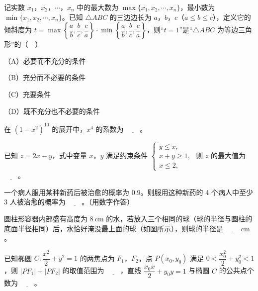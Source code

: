 \begin{question}
记实数 $x_1$，$x_2$，$\cdots$，$x_n$ 中的最大数为 $\max\{x_1,x_2,\cdots,x_n\}$，最小数为 $\min\{x_1,x_2,\cdots,x_n\}$。已知 $\triangle ABC$ 的三边边长为 $a$，$b$，$c$（$a\leqslant b\leqslant c$），定义它的倾斜度为 $t=\max\left\{\dfrac ab,\dfrac bc,\dfrac ca\right\}\cdot\min\left\{\dfrac ab,\dfrac bc,\dfrac ca\right\}$，则“$t=1$”是“$\triangle ABC$ 为等边三角形”的（　）

（A）必要而不充分的条件

（B）充分而不必要的条件

（C）充要条件

（D）既不充分也不必要的条件

\end{question}
\begin{question}
在 $(1-x^2)^{10}$ 的展开中，$x^4$ 的系数为 $\underline{\qquad}$。

\end{question}
\begin{question}
已知 $z=2x-y$，式中变量 $x$，$y$ 满足约束条件 $\begin{cases}y\leqslant x,\\x+y\geqslant1,\\x\leqslant2,\end{cases}$ 则 $z$ 的最大值为 $\underline{\qquad}$。

\end{question}
\begin{question}
一个病人服用某种新药后被治愈的概率为 $0.9$。则服用这种新药的 4 个病人中至少 3 人被治愈的概率为 $\underline{\qquad}$。（用数字作答）

\Needspace{0.4\textheight}
\end{question}
\begingroup
\renewenvironment{question}{\Needspace{0.5\textheight}}{}
\begin{question}
圆柱形容器内部盛有高度为 $8\ \mathrm{cm}$ 的水，若放入三个相同的球（球的半径与圆柱的底面半径相同）后，水恰好淹没最上面的球（如图所示），则球的半径是 $\underline{\qquad}\ \mathrm{cm}$。
\nopagebreak[4]
\begin{center}\end{center}
\nopagebreak[4]
\end{question}
\endgroup
\begin{question}
已知椭圆 $C:\dfrac{x^2}{2}+y^2=1$ 的两焦点为 $F_1$，$F_2$，点 $P(x_0,y_0)$ 满足 $0<\dfrac{x_0^2}{2}+y_0^2<1$，则 $|PF_1|+|PF_2|$ 的取值范围为 $\underline{\qquad}$，直线 $\dfrac{x_0x}{2}+y_0y=1$ 与椭圆 $C$ 的公共点个数为 $\underline{\qquad}$。

\end{question}
